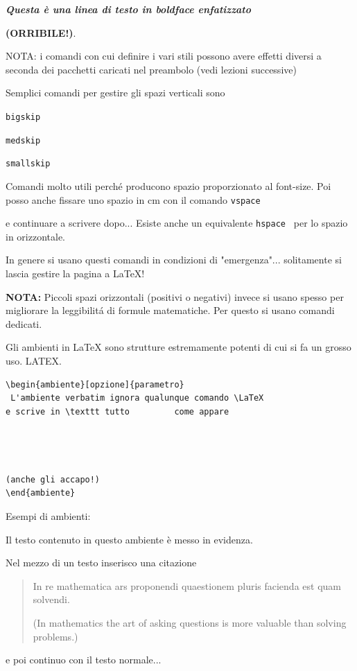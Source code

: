\documentclass[12pt]{article}
\begin{document}
{\bf \em Questa \`e una linea di testo in boldface enfatizzato}

{\huge \bf (ORRIBILE!)}.

\bigskip
NOTA: i comandi con cui definire i vari stili possono avere effetti diversi a seconda dei pacchetti caricati nel preambolo (vedi lezioni successive)
\newpage

Semplici comandi per gestire gli spazi verticali sono

\bigskip
{\tt	bigskip }

\medskip
{\tt medskip}

\smallskip
{\tt smallskip}

Comandi molto utili perch\'e producono spazio proporzionato al font-size. Poi posso anche fissare uno spazio in cm con il comando {\tt vspace	}
\vspace{5cm}

e continuare a scrivere dopo... Esiste anche un equivalente {\tt hspace	} \hspace{2cm} per lo spazio in orizzontale.

In genere si usano questi comandi in condizioni di "emergenza"... solitamente si lascia gestire la pagina a \LaTeX!

{\bf NOTA:} Piccoli spazi orizzontali (positivi o negativi) invece si usano spesso per migliorare la leggibilit\'a di formule matematiche. Per questo si usano comandi dedicati.
\newpage

Gli ambienti in \LaTeX {} sono strutture estremamente potenti di cui si fa un grosso uso.
LATEX.


 

\begin{verbatim}
\begin{ambiente}[opzione]{parametro}
 L'ambiente verbatim ignora qualunque comando \LaTeX 
e scrive in \texttt tutto         come appare 




(anche gli accapo!)
\end{ambiente}
\end{verbatim}

Esempi di ambienti:

\begin{em}
Il testo contenuto in questo ambiente \`e messo in evidenza.
\end{em}

\bigskip
Nel mezzo di un testo inserisco una citazione
\begin{quote}
In re mathematica ars proponendi quaestionem 
pluris facienda est quam solvendi.

(In mathematics the art of asking questions 
is more valuable than solving problems.)
\end{quote}
e poi continuo con il testo normale...
\end{document}
